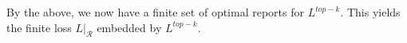\documentclass[12pt]{article}
\newcommand{\prop}[1]{\Gamma[#1]}
\newcommand{\simplex}{\Delta_\Y}
\newcommand{\R}{\mathcal{R}}
\newcommand{\Y}{\mathcal{Y}}
\newtheorem{conjecture}{Conjecture}
\begin{document}
By the above, we now have a finite set of optimal reports for $L^{top-k}$.
This yields the finite loss $L|_\R$ embedded by $L^{top-k}$.

\end{document}
